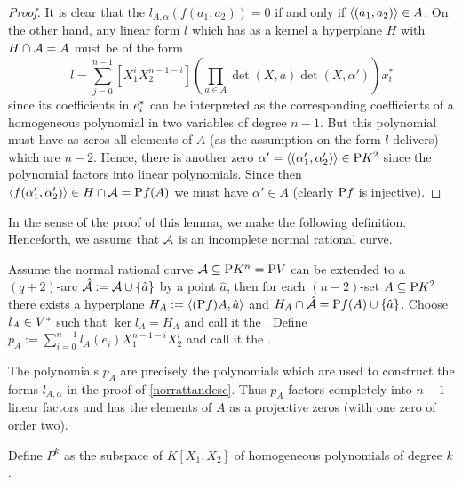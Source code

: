 \begin{proof}
    It is clear that the $l_{A,\alpha}(f(a_1,a_2))=0$ if and only if $\gen{(a_1,a_2)}\in A$. On the other hand, any linear form $l$ which has as a kernel a hyperplane $H$ with $H\cap\mathcal{A}=A$ must be of the form
    $$
    l=\sum_{j=0}^{n-1}{[X_1^i X_2^{n-1-i}]\left(\prod_{a\in A}{\det(X,a)}\det(X,\alpha')\right)x_i^{\ast}}
    $$
    since its coefficients in $e^{\ast}_i$ can be interpreted as the corresponding coefficients of a homogeneous polynomial in two variables of degree $n-1$. But this polynomial must have as zeros all elements of $A$ (as the assumption on the form $l$ delivers) which are $n-2$. Hence, there is another zero $\alpha'=\gen{(\alpha'_1,\alpha'_2)}\in\proj{K^2}$ since the polynomial factors into linear polynomials. Since then $\gen{f(\alpha'_1,\alpha'_2)}\in H\setmeet\cA=\proj f(A)$ we must have $\alpha'\in A$ (clearly $\mathrm{P} f$ is injective).
\end{proof}

In the sense of the proof of this lemma, we make the following definition.
Henceforth, we assume that $\mathcal{A}$ is an incomplete normal rational curve.

\begin{definition}
    Assume the normal rational curve $\mathcal{A}\subseteq \mathrm{P}{K^n}=\mathrm{P}{V}$ can be extended to a $(q+2)$-arc $\hat{\mathcal{A}}:=\mathcal{A}\cup\left\{\hat{a}\right\}$ by a point $\hat a$, then for each $(n-2)$-set $A\subseteq\mathrm{P}{K^2}$ there exists a hyperplane $H_A:=\gen{(\proj f)A,\hat{a}}$ and $H_A\cap \hat{\mathcal{A}}=\mathrm{P} f(A)\cup\left\{\hat{a}\right\}$. Choose $l_A\in V^{\ast}$ such that $\ker{l_A}=H_A$ and call it the .
    Define $p_A:=\sum_{i=0}^{n-1}{l_A(e_i)X_1^{n-1-i}X_2^i}$ and call it the .
\end{definition}

\begin{remark}
    The polynomials $p_A$ are precisely the polynomials which are used to construct the forms $l_{A,\alpha}$ in the proof of \autoref{norrattandesc}. Thus $p_A$ factors completely into $n-1$ linear factors and has the elements of $A$ as a projective zeros (with one zero of order two).
\end{remark}

\begin{definition}
    Define $P^k$ as the subspace of $K[X_1,X_2]$ of homogeneous polynomials of degree $k$.
\end{definition}

